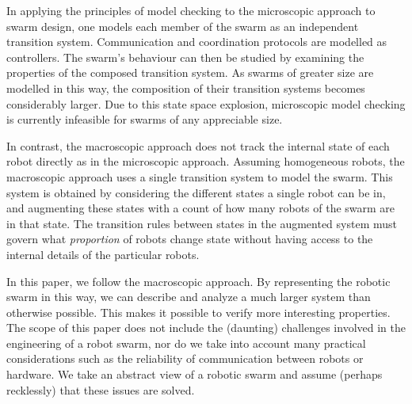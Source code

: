 \documentclass[11pt]{article}
\theoremstyle{definition}
\begin{document}
In applying the principles of model checking to the microscopic approach to
swarm design, one models each member of the swarm as an independent transition
system.
Communication and coordination protocols are modelled as controllers.
The swarm's behaviour can then be studied by examining the properties of the
composed transition system.
As swarms of greater size are modelled in this way, the composition of their
transition systems becomes considerably larger.
Due to this state space explosion, microscopic model checking is currently
infeasible for swarms of any appreciable size.

%
In contrast, the macroscopic approach does not track the internal state of each
robot directly as in the microscopic approach.
Assuming homogeneous robots, the macroscopic approach uses a single
transition system to model the swarm.
This system is obtained by considering the different states a single robot can
be in, and augmenting these states with a count of how many robots of the swarm
are in that state.
The transition rules between states in the augmented system must
govern what \emph{proportion} of robots change state without having access to
the internal details of the particular robots.

%
In this paper, we follow the macroscopic approach.
By representing the robotic swarm in this way, we can describe and analyze a
much larger system than otherwise possible.
This makes it possible to verify more interesting properties.
%
The scope of this paper does not include the (daunting) challenges involved in
the engineering of a robot swarm, nor do we take into account many practical
considerations such as the reliability of communication between robots or
hardware.
We take an abstract view of a robotic swarm and assume (perhaps recklessly)
that these issues are solved.
\end{document}
